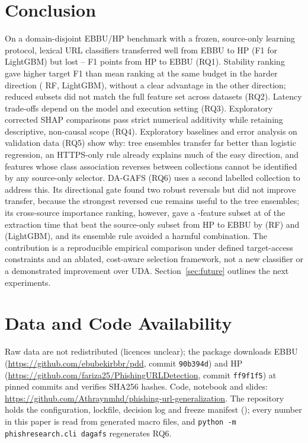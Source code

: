\section{Conclusion}
On a domain-disjoint EBBU/HP benchmark with a frozen, source-only learning protocol, lexical URL classifiers transferred well from EBBU to HP (F1  for LightGBM) but lost -- F1 points from HP to EBBU (RQ1). Stability ranking gave higher target F1 than mean ranking at the same budget in the harder direction ( RF,  LightGBM), without a clear advantage in the other direction; reduced subsets did not match the full feature set across datasets (RQ2). Latency trade-offs depend on the model and execution setting (RQ3). Exploratory corrected SHAP comparisons pass strict numerical additivity while retaining descriptive, non-causal scope (RQ4). Exploratory baselines and error analysis on validation data (RQ5) show why: tree ensembles transfer far better than logistic regression, an HTTPS-only rule already explains much of the easy direction, and features whose class association reverses between collections cannot be identified by any source-only selector. DA-GAFS (RQ6) uses a second labelled collection to address this. Its directional gate found two robust reversals but did not improve transfer, because the strongest reversed cue remains useful to the tree ensembles; its cross-source importance ranking, however, gave a -feature subset at  of the extraction time that beat the source-only subset from HP to EBBU by  (RF) and  (LightGBM), and its ensemble rule avoided a harmful combination. The contribution is a reproducible empirical comparison under defined target-access constraints and an ablated, cost-aware selection framework, not a new classifier or a demonstrated improvement over UDA. Section~\ref{sec:future} outlines the next experiments.

\section*{Data and Code Availability}
Raw data are not redistributed (licences unclear); the package downloads EBBU (\url{https://github.com/ebubekirbbr/pdd}, commit \texttt{90b394d}) and HP (\url{https://github.com/fariza25/PhishingURLDetection}, commit \texttt{ff9f1f5}) at pinned commits and verifies SHA256 hashes. Code, notebook and slides: \url{https://github.com/Athraynmhd/phishing-url-generalization}. The repository holds the configuration, lockfile, decision log and freeze manifest (\texttt{}); every number in this paper is read from generated macro files, and \texttt{python -m phishresearch.cli dagafs} regenerates RQ6.
